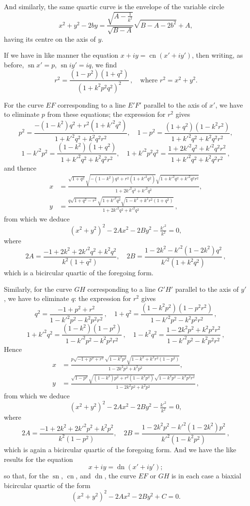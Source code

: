 \documentclass[11pt,a4paper]{article}
\DeclareMathOperator{\sn}{sn}
\DeclareMathOperator{\cn}{cn}
\DeclareMathOperator{\dn}{dn}
\begin{document}
And similarly, the same quartic curve is the envelope of the variable circle
\[
x^2 + y^2 - 2by = \dfrac{\sqrt{A - \tfrac{1}{k^2}}}{\sqrt{B - A}}\sqrt{B - A - 2b^2} + A,
\]
having its centre on the axis of $y$.

If we have in like manner the equation $x + iy = \cn(x' + iy')$, then writing, as before, $\sn x' = p$, $\sn iy' = iq$, we find
\[
r^2 = \frac{(1 - p^2)(1 + q^2)}{(1 + k^2 p^2 q^2)^2}\,,\quad\text{where }r^2 = x^2 + y^2.
\]

For the curve $EF$ corresponding to a line $E'F'$ parallel to the axis of $x'$, we have to eliminate $p$ from these equations; the expression for $r^2$ gives
\[
p^2 = \frac{-(1 - k^2)q^2 + r^2(1 + k'^2 q^2)}{1 + k'^2 q^2 + k^2 q^2 r^2},\quad 1 - p^2 = \frac{(1 + q^2)(1 - k^2 r^2)}{1 + k'^2 q^2 + k^2 q^2 r^2},
\]
\[
1 - k'^2 p^2 = \frac{(1 - k^2)(1 + q^2)}{1 + k'^2 q^2 + k^2 q^2 r^2},\quad 1 + k'^2 p^2 q^2 = \frac{1 + 2k'^2 q^2 + k'^2 q^2 r^2}{1 + k'^2 q^2 + k^2 q^2 r^2}\,,
\]
and thence
\begin{align*}
x &= \frac{\sqrt{1+q^2}\sqrt{-(1-k^2)q^2 + r^2(1+k'^2 q^2)}\sqrt{1+k'^2 q^2 + k'^2 q^2 r^2}}{1 + 2k'^2 q^2 + k'^2 q^2},\\
y &= \frac{q\sqrt{1+q^2-r^2}\sqrt{1+k'^2 q^2}\sqrt{1 - k^2 + k^2 r^2(1+q^2)}}{1 + 2k'^2 q^2 + k'^2 q^2}\,,
\end{align*}
from which we deduce
\[
(x^2 + y^2)^2 - 2Ax^2 - 2By^2 - \tfrac{k'^2}{k^2} = 0,
\]
where
\[
2A = \frac{-1 + 2k^2 + 2k'^2 q^2 + k^2 q^2}{k^2(1 + q^2)},\quad 2B = \frac{1 - 2k^2 - k'^2(1 - 2k^2) q^2}{k'^2(1 + k^2 q^2)}\,,
\]
which is a bicircular quartic of the foregoing form.

Similarly, for the curve $GH$ corresponding to a line $G'H'$ parallel to the axis of $y'$, we have to eliminate $q$: the expression for $r^2$ gives
\[
q^2 = \frac{-1 + p^2 + r^2}{1 - k'^2 p^2 - k^2 p^2 r^2}\,,\quad 1 + q^2 = \frac{(1 - k^2 p^2)(1 - p^2 r^2)}{1 - k'^2 p^2 - k^2 p^2 r^2}\,,
\]
\[
1 + k'^2 q^2 = \frac{(1 - k^2)(1 - p^2)}{1 - k'^2 p^2 - k^2 p^2 r^2}\,,\quad 1 - k^2 q^2 = \frac{1 - 2k^2 p^2 + k^2 p^2 r^2}{1 - k'^2 p^2 - k^2 p^2 r^2}\,,
\]
Hence
\begin{align*}
x &= \frac{p\sqrt{-1 + p^2 + r^2}\sqrt{1 - k^2 p^2}\sqrt{1 - k^2 + k^2 r^2(1 - p^2)}}{1 - 2k^2 p^2 + k^2 p^2},\\
y &= \frac{\sqrt{1 - p^2}\sqrt{(1 - k^2)p^2 + r^2(1 - k^2 p^2)}\sqrt{1 - k^2 p^2 - k^2 p^2 r^2}}{1 - 2k^2 p^2 + k^2 p^2}\,,
\end{align*}
from which we deduce
\[
(x^2 + y^2)^2 - 2Ax^2 - 2By^2 - \tfrac{k'^2}{k^2} = 0,
\]
where
\[
2A = \frac{-1 + 2k^2 + 2k'^2 p^2 + k^2 p^2}{k^2(1 - p^2)},\quad 2B = \frac{1 - 2k^2 p^2 - k'^2(1 - 2k^2)p^2}{k'^2(1 - k^2 p^2)}\,,
\]
which is again a bicircular quartic of the foregoing form. And we have the like results for the equation
\[
x + iy = \dn(x' + iy');
\]
so that, for the $\sn$, $\cn$, and $\dn$, the curve $EF$ or $GH$ is in each case a biaxial bicircular quartic of the form
\[
(x^2 + y^2)^2 - 2Ax^2 - 2By^2 + C = 0.
\]
\end{document}

